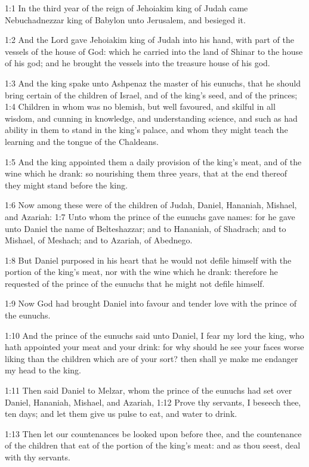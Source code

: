 

1:1 In the third year of the reign of Jehoiakim king of Judah came Nebuchadnezzar king of Babylon unto Jerusalem, and besieged it.

1:2 And the Lord gave Jehoiakim king of Judah into his hand, with part of the vessels of the house of God: which he carried into the land of Shinar to the house of his god; and he brought the vessels into the treasure house of his god.

1:3 And the king spake unto Ashpenaz the master of his eunuchs, that he should bring certain of the children of Israel, and of the king's seed, and of the princes; 1:4 Children in whom was no blemish, but well favoured, and skilful in all wisdom, and cunning in knowledge, and understanding science, and such as had ability in them to stand in the king's palace, and whom they might teach the learning and the tongue of the Chaldeans.

1:5 And the king appointed them a daily provision of the king's meat, and of the wine which he drank: so nourishing them three years, that at the end thereof they might stand before the king.

1:6 Now among these were of the children of Judah, Daniel, Hananiah, Mishael, and Azariah: 1:7 Unto whom the prince of the eunuchs gave names: for he gave unto Daniel the name of Belteshazzar; and to Hananiah, of Shadrach; and to Mishael, of Meshach; and to Azariah, of Abednego.

1:8 But Daniel purposed in his heart that he would not defile himself with the portion of the king's meat, nor with the wine which he drank: therefore he requested of the prince of the eunuchs that he might not defile himself.

1:9 Now God had brought Daniel into favour and tender love with the prince of the eunuchs.

1:10 And the prince of the eunuchs said unto Daniel, I fear my lord the king, who hath appointed your meat and your drink: for why should he see your faces worse liking than the children which are of your sort? then shall ye make me endanger my head to the king.

1:11 Then said Daniel to Melzar, whom the prince of the eunuchs had set over Daniel, Hananiah, Mishael, and Azariah, 1:12 Prove thy servants, I beseech thee, ten days; and let them give us pulse to eat, and water to drink.

1:13 Then let our countenances be looked upon before thee, and the countenance of the children that eat of the portion of the king's meat: and as thou seest, deal with thy servants.

